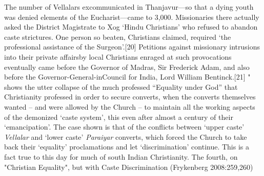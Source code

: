 {The number of Vellalars excommunicated in Thanjavur—so that a dying youth was denied elements of the Eucharist—came to 3,000. Missionaries there actually asked the District Magistrate to Xog ‘Hindu Christians’ who refused to abandon caste strictures. One person so beaten, Christians claimed, required ‘the professional assistance of the Surgeon’.[20] Petitions against missionary intrusions into their private affairsby local Christians enraged at such provocations eventually came before the Governor of Madras, Sir Frederick Adam, and also before the Governor-General-inCouncil for India, Lord William Bentinck.[21] "} shows the utter collapse of the much professed “Equality under God” that Christianity professed in order to secure converts, when the converts themselves wanted – and were allowed by the Church – to maintain all the working aspects of the demonized ‘caste system’, this even after almost a century of their ‘emancipation’. The case shown is that of the conflicts between ‘upper caste’ \textit{Vellalar} and ‘lower caste’ \textit{Paraiyar} converts, which forced the Church to take back their ‘equality’ proclamations and let ‘discrimination’ continue. This is a fact true to this day for much of south Indian Christianity. The fourth, on "Christian Equality", but with Caste Discrimination (Frykenberg 2008:259,260)
